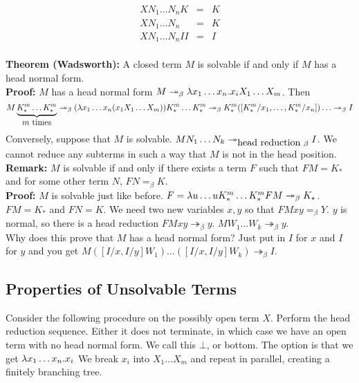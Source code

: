 \begin{eqnarray*}
  XN_1\ldots N_nK &=& K\\
  XN_1\ldots N_n &=& K\\
  XN_1\ldots N_n II &=& I\\
\end{eqnarray*}

\textbf{Theorem (Wadsworth):} A closed term $M$ is solvable if and only if $M$ has a head normal form.\\

\textbf{Proof:} $M$ has a head normal form $M \twoheadrightarrow_\beta \lambda x_1\ldots x_n . x_i X_1\ldots X_m$. Then
\begin{equation*}
  M\underbrace{K_*^m\ldots K_*^m}_{\hbox{$m$ times}} \twoheadrightarrow_\beta (\lambda x_1 \ldots x_n(x_1X_1\ldots X_m))K_*^m\ldots K_*^m \twoheadrightarrow_\beta K_*^m ([K_*^m/x_1,\ldots,K_*^m/x_n])\ldots \twoheadrightarrow_\beta I
\end{equation*}
Conversely, suppose that $M$ is solvable. $M N_1\ldots N_k  \twoheadrightarrow_{\hbox{head reduction }\beta} I$. We cannot reduce any subterms in such a way that $M$ is not in the head position.\\

\textbf{Remark:} $M$ is solvable if and only if there exists a term $F$ such that $FM = K_*$ and for some other term $N$, $FN =_\beta K$.\\

\textbf{Proof:} $M$ is solvable just like before. $F = \lambda u\ldots u K_*^m\ldots K_*^mFM \twoheadrightarrow_\beta K_*$. $FM = K_*$ and $FN = K$. We need two new variables $x,y$ so that $FMxy =_\beta Y$. $y$ is normal, so there is a head reduction $FMxy \twoheadrightarrow_\beta y$. $MW_1\ldots W_k \twoheadrightarrow_\beta y$.\\

Why does this prove that $M$ has a head normal form? Just put in $I$ for $x$ and $I$ for $y$ and you get $M([I/x,I/y]W_1)\ldots([I/x,I/y]W_k) \twoheadrightarrow_\beta I$.

\subsection{Properties of Unsolvable Terms}
Consider the following procedure on the possibly open term $X$. Perform the head reduction sequence. Either it does not terminate, in which case we have an open term with no head normal form. We call this $\bot$, or bottom. The option is that we get $\lambda x_1\ldots x_n.x_i$ We break $x_i$ into $X_1\ldots X_m$ and repeat in parallel, creating a finitely branching tree.
\begin{center}
\end{center}

